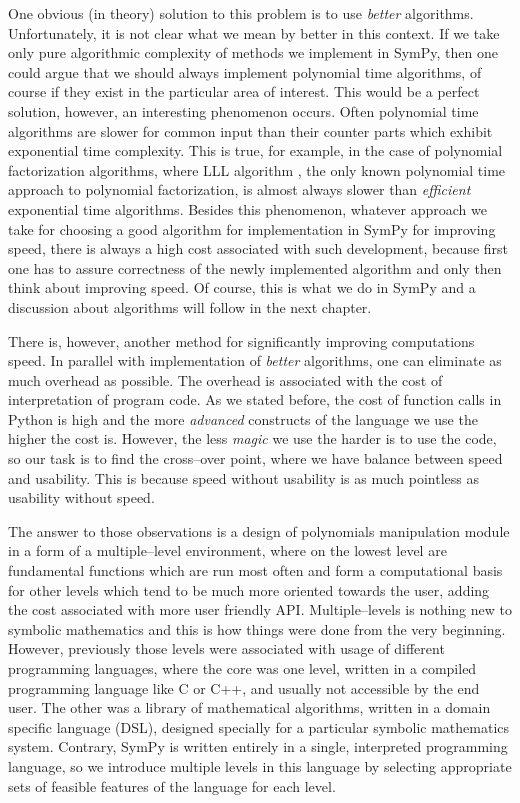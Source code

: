 One obvious (in theory) solution to this problem is to use \emph{better} algorithms. Unfortunately, it
is not clear what we mean by better in this context. If we take only pure algorithmic complexity
of methods we implement in SymPy, then one could argue that we should always implement polynomial
time algorithms, of course if they exist in the particular area of interest. This would be a perfect
solution, however, an interesting phenomenon occurs. Often polynomial time algorithms are slower for
common input than their counter parts which exhibit exponential time complexity. This is true, for
example, in the case of polynomial factorization algorithms, where LLL algorithm \cite{Lenstra1982factor},
the only known polynomial time approach to polynomial factorization, is almost always slower than
\emph{efficient} exponential time algorithms. Besides this phenomenon, whatever approach we take for choosing
a good algorithm for implementation in SymPy for improving speed, there is always a high cost associated
with such development, because first one has to assure correctness of the newly implemented algorithm and
only then think about improving speed. Of course, this is what we do in SymPy and a discussion about
algorithms will follow in the next chapter.

There is, however, another method for significantly improving computations speed. In parallel with
implementation of \emph{better} algorithms, one can eliminate as much overhead as possible. The overhead
is associated with the cost of interpretation of program code. As we stated before, the cost of
function calls in Python is high and the more \emph{advanced} constructs of the language we use the
higher the cost is. However, the less \emph{magic} we use the harder is to use the code, so our task
is to find the cross--over point, where we have balance between speed and usability. This is
because speed without usability is as much pointless as usability without speed.

The answer to those observations is a design of polynomials manipulation module in a form of a
multiple--level environment, where on the lowest level are fundamental functions which are run
most often and form a computational basis for other levels which tend to be much more oriented
towards the user, adding the cost associated with more user friendly API. Multiple--levels is
nothing new to symbolic mathematics and this is how things were done from the very beginning.
However, previously those levels were associated with usage of different programming languages,
where the core was one level, written in a compiled programming language like C or C++, and
usually not accessible by the end user. The other was a library of mathematical algorithms,
written in a domain specific language (DSL), designed specially for a particular symbolic
mathematics system. Contrary, SymPy is written entirely in a single, interpreted programming
language, so we introduce multiple levels in this language by selecting appropriate sets of
feasible features of the language for each level.

